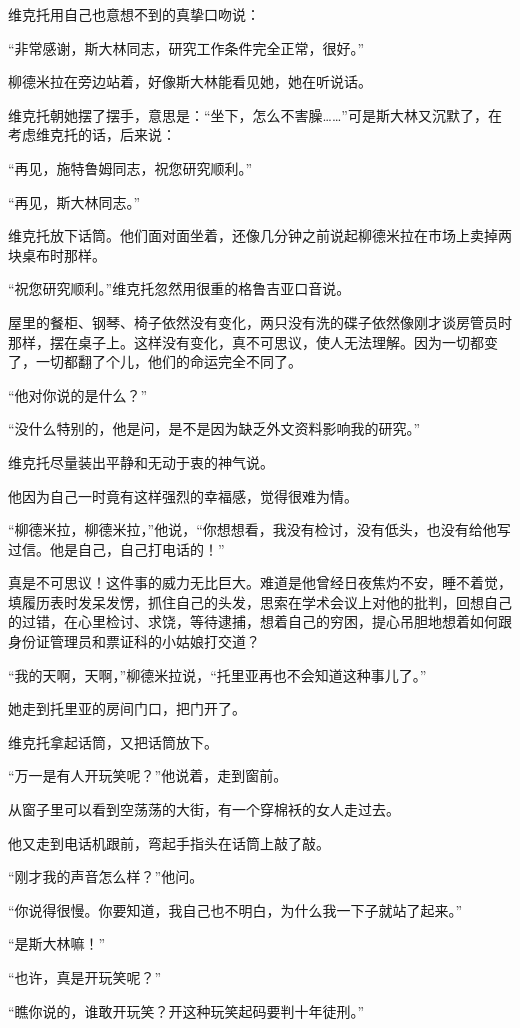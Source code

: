 维克托用自己也意想不到的真挚口吻说：

“非常感谢，斯大林同志，研究工作条件完全正常，很好。”

柳德米拉在旁边站着，好像斯大林能看见她，她在听说话。

维克托朝她摆了摆手，意思是：“坐下，怎么不害臊……”可是斯大林又沉默了，在考虑维克托的话，后来说：

“再见，施特鲁姆同志，祝您研究顺利。”

“再见，斯大林同志。”

维克托放下话筒。他们面对面坐着，还像几分钟之前说起柳德米拉在市场上卖掉两块桌布时那样。

“祝您研究顺利。”维克托忽然用很重的格鲁吉亚口音说。

屋里的餐柜、钢琴、椅子依然没有变化，两只没有洗的碟子依然像刚才谈房管员时那样，摆在桌子上。这样没有变化，真不可思议，使人无法理解。因为一切都变了，一切都翻了个儿，他们的命运完全不同了。

“他对你说的是什么？”

“没什么特别的，他是问，是不是因为缺乏外文资料影响我的研究。”

维克托尽量装出平静和无动于衷的神气说。

他因为自己一时竟有这样强烈的幸福感，觉得很难为情。

“柳德米拉，柳德米拉，”他说，“你想想看，我没有检讨，没有低头，也没有给他写过信。他是自己，自己打电话的！”

真是不可思议！这件事的威力无比巨大。难道是他曾经日夜焦灼不安，睡不着觉，填履历表时发呆发愣，抓住自己的头发，思索在学术会议上对他的批判，回想自己的过错，在心里检讨、求饶，等待逮捕，想着自己的穷困，提心吊胆地想着如何跟身份证管理员和票证科的小姑娘打交道？

“我的天啊，天啊，”柳德米拉说，“托里亚再也不会知道这种事儿了。”

她走到托里亚的房间门口，把门开了。

维克托拿起话筒，又把话筒放下。

“万一是有人开玩笑呢？”他说着，走到窗前。

从窗子里可以看到空荡荡的大街，有一个穿棉袄的女人走过去。

他又走到电话机跟前，弯起手指头在话筒上敲了敲。

“刚才我的声音怎么样？”他问。

“你说得很慢。你要知道，我自己也不明白，为什么我一下子就站了起来。”

“是斯大林嘛！”

“也许，真是开玩笑呢？”

“瞧你说的，谁敢开玩笑？开这种玩笑起码要判十年徒刑。”

